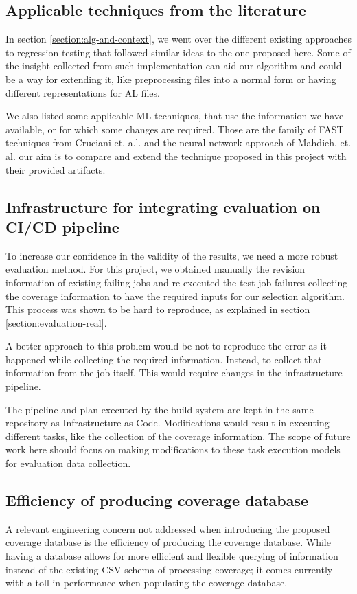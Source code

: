 \documentclass{article}
\begin{document}
\subsection{Applicable techniques from the literature}
In section \ref{section:alg-and-context}, we went over the different existing approaches to regression testing that followed similar ideas to the one proposed here. Some of the insight collected from such implementation can aid our algorithm and could be a way for extending it, like preprocessing files into a normal form or having different representations for AL files.

We also listed some applicable ML techniques\cite{MAHDIEH2020106269}\cite{10.1109/ICSE.2019.00055}\cite{10.1145/3180155.3180210}, that use the information we have available, or for which some changes are required. Those are the family of FAST techniques from Cruciani et. a.l. \cite{10.1109/ICSE.2019.00055} and the neural network approach of Mahdieh, et. al. \cite{MAHDIEH2020106269} our aim is to compare and extend the technique proposed in this project with their provided artifacts.

\subsection{Infrastructure for integrating evaluation on CI/CD pipeline}
To increase our confidence in the validity of the results, we need a more robust evaluation method. For this project, we obtained manually the revision information of existing failing jobs and re-executed the test job failures collecting the coverage information to have the required inputs for our selection algorithm. This process was shown to be hard to reproduce, as explained in section \ref{section:evaluation-real}.

A better approach to this problem would be not to reproduce the error as it happened while collecting the required information. Instead, to collect that information from the job itself. This would require changes in the infrastructure pipeline.

The pipeline and plan executed by the build system are kept in the same repository as Infrastructure-as-Code. Modifications would result in executing different tasks, like the collection of the coverage information.
 The scope of future work here should focus on making modifications to these task execution models for evaluation data collection.

\subsection{Efficiency of producing coverage database}
A relevant engineering concern not addressed when introducing the proposed coverage database is the efficiency of producing the coverage database. While having a database allows for more efficient and flexible querying of information instead of the existing CSV schema of processing coverage; it comes currently with a toll in performance when populating the coverage database.
\end{document}
